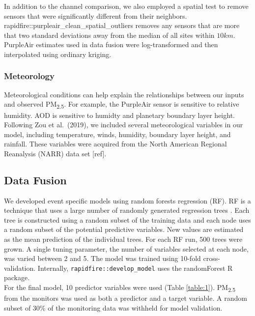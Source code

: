 \documentclass[gmd, manuscript]{copernicus}
\begin{document}
In addition to the channel comparison, we also employed a spatial test
to remove sensors that were significantly different from their
neighbors. rapidfire::purpleair\_clean\_spatial\_outliers removes any
sensors that are more that two standard deviations away from the median
of all sites within \(10\unit {km}\). PurpleAir estimates used in data
fusion were log-transformed and then interpolated using ordinary
kriging.

\subsubsection{Meteorology}

Meteorological conditions can help explain the relationships between our
inputs and observed PM\textsubscript{2.5}. For example, the PurpleAir
sensor is sensitive to relative humidity. AOD is sensitive to humidty
and planetary boundary layer height. Following Zou et al.~(2019), we
included several meteorological variables in our model, including
temperature, winds, humidity, boundary layer height, and rainfall. These
variables were acquired from the North American Regional Reanalysis
(NARR) data set {[}ref{]}.

\subsection{Data Fusion}

We developed event specific models using random forests regression (RF).
RF is a technique that uses a large number of randomly generated
regression trees \citep{Breiman2001}. Each tree is constructed using a
random subset of the training data and each node uses a random subset of
the potential predictive variables. New values are estimated as the mean
prediction of the individual trees. For each RF run, 500 trees were
grown. A single tuning parameter, the number of variables selected at
each node, was varied between 2 and 5. The model was trained using
10-fold cross-validation. Internally, \texttt{rapidfire::develop\_model}
uses the randomForest R package.\\
For the final model, 10 predictor variables were used (Table
\ref{table:1}). PM\textsubscript{2.5} from the monitors was used as both
a predictor and a target variable. A random subset of 30\% of the
monitoring data was withheld for model validation.
\end{document}
